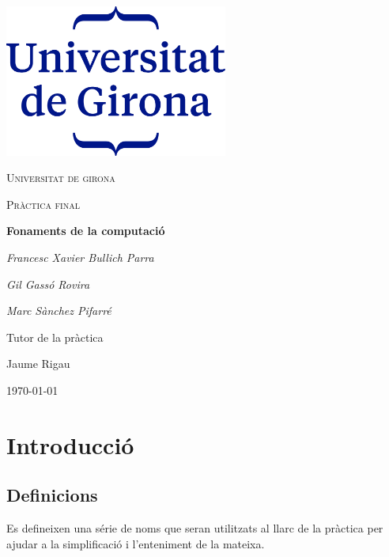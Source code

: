 \documentclass[12pt,a4paper]{report}
\begin{document}
\begin{titlepage}
	\centering
	\includegraphics[width=0.55\textwidth]{udg_logo.png}\par\vspace{1cm}
	{\scshape\LARGE Universitat de girona \par}
	\vspace{1cm}
	{\scshape\Large Pràctica final\par}
	\vspace{1.5cm}
	{\huge\bfseries Fonaments de la computació\par}
	\vspace{2cm}
	{\Large\itshape Francesc Xavier Bullich Parra\par}
	{\Large\itshape Gil Gassó Rovira\par}
	{\Large\itshape Marc Sànchez Pifarré\par}

	\vfill
	Tutor de la pràctica\par
	Jaume Rigau

	\vfill

	{\large \today\par}
\end{titlepage}

\tableofcontents
\clearpage


\chapter{Introducció}
\setcounter{chapter}{1}

\section{Definicions}

Es defineixen una série de noms que seran utilitzats al llarc de la pràctica per ajudar a la simplificació i l'enteniment de la mateixa.
\end{document}
